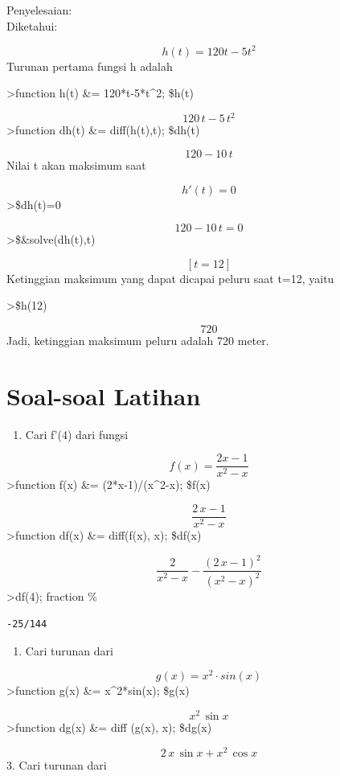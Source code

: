 \documentclass[
]{book}
\providecommand{\tightlist}{%
  \setlength{\itemsep}{0pt}\setlength{\parskip}{0pt}}
\begin{document}
Penyelesaian:\\
Diketahui:

\[h(t)=120t-5t^2\] Turunan pertama fungsi h adalah

\textgreater function h(t) \&= 120*t-5*t\^{}2; \$h(t)

\[120\,t-5\,t^2\]\textgreater function dh(t) \&= diff(h(t),t); \$dh(t)

\[120-10\,t\] Nilai t akan maksimum saat

\[h'(t)=0\]\textgreater\$dh(t)=0

\[120-10\,t=0\]\textgreater\$\&solve(dh(t),t)

\[\left[ t=12 \right] \] Ketinggian maksimum yang dapat dicapai peluru saat t=12, yaitu

\textgreater\$h(12)

\[720\] Jadi, ketinggian maksimum peluru adalah 720 meter.

\section{Soal-soal Latihan}\label{soal-soal-latihan}

\begin{enumerate}
\def\labelenumi{\arabic{enumi}.}
\tightlist
\item
  Cari f'(4) dari fungsi
\end{enumerate}

\[f(x) = \frac {2x-1}{x^2-x}\]\textgreater function f(x) \&= (2*x-1)/(x\^{}2-x); \$f(x)

\[\frac{2\,x-1}{x^2-x}\]\textgreater function df(x) \&= diff(f(x), x); \$df(x)

\[\frac{2}{x^2-x}-\frac{\left(2\,x-1\right)^2}{\left(x^2-x\right)^2}\]\textgreater df(4); fraction \%

\begin{verbatim}
-25/144
\end{verbatim}

\begin{enumerate}
\def\labelenumi{\arabic{enumi}.}
\setcounter{enumi}{1}
\tightlist
\item
  Cari turunan dari
\end{enumerate}

\[g(x)=x^2\cdot sin(x)\]\textgreater function g(x) \&= x\^{}2*sin(x); \$g(x)

\[x^2\,\sin x\]\textgreater function dg(x) \&= diff (g(x), x); \$dg(x)

\[2\,x\,\sin x+x^2\,\cos x\]3. Cari turunan dari
\end{document}
